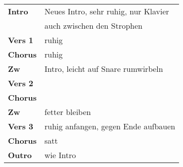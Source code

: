 
\begin{tabular}{p{1.6cm}l}
	\textbf{Intro}  & Neues Intro, sehr ruhig, nur Klavier \\
	                & auch zwischen den Strophen           \\
	\textbf{Vers 1} & ruhig                                \\
	\textbf{Chorus} & ruhig                                \\
	\textbf{Zw}     & Intro, leicht auf Snare rumwirbeln   \\
	\textbf{Vers 2} &                                      \\
	\textbf{Chorus} &                                      \\
	\textbf{Zw}     & fetter bleiben                       \\
	\textbf{Vers 3} & ruhig anfangen, gegen Ende aufbauen  \\
	\textbf{Chorus} & satt                                 \\
	\textbf{Outro}  & wie Intro                            \\
\end{tabular}
